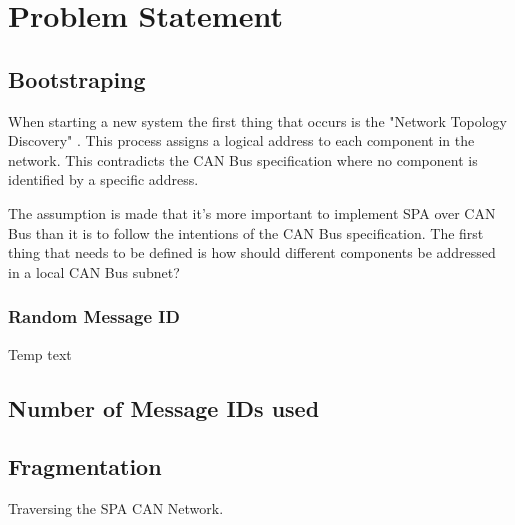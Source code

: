 \section{Problem Statement}\label{ch:problem_statement}
\subsection{Bootstraping}
When starting a new system the first thing that occurs is the "Network Topology
Discovery" \cite{standard:spa_networking}. This process assigns a logical
address to each component in the network. This contradicts the CAN Bus
specification where no component is identified by a specific address.

The assumption is made that it's more important to implement SPA over CAN Bus
than it is to follow the intentions of the CAN Bus specification. The first
thing that needs to be defined is how should different components be addressed
in a local CAN Bus subnet?


\subsubsection{Random Message ID}
Temp text
\subsection{Number of Message IDs used}
\subsection{Fragmentation}
Traversing the SPA CAN Network.
